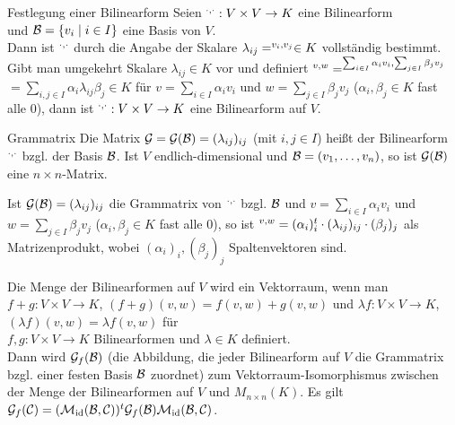 \begin{Satz}{Festlegung einer Bilinearform}
    Seien $\sp{\cdot, \cdot}: V \times V \rightarrow K$ eine Bilinearform \\
    und $\mathcal{B} = \{v_i \;|\; i \in I\}$ eine Basis von $V$. \\
    Dann ist $\sp{\cdot, \cdot}$ durch die Angabe der Skalare
    $\lambda_{ij} = \sp{v_i, v_j} \in K$ vollständig bestimmt. \\
    Gibt man umgekehrt Skalare $\lambda_{ij} \in K$ vor und definiert
    $\sp{v, w} = \sp{\sum_{i \in I} \alpha_i v_i, \sum_{j \in I} \beta_j v_j}$\\
    $= \sum_{i, j \in I} \alpha_i \lambda_{ij} \beta_j \in K$
    für $v = \sum_{i \in I} \alpha_i v_i$ und
    $w = \sum_{j \in I} \beta_j v_j$ ($\alpha_i, \beta_j \in K$ fast alle $0$),
    dann ist $\sp{\cdot, \cdot}: V \times V \rightarrow K$ eine Bilinearform
    auf $V$.
\end{Satz}

\begin{Def}{Grammatrix}
    Die Matrix $\mathcal{G} = \mathcal{G}(\mathcal{B}) = (\lambda_{ij})_{ij}$
    (mit $i, j \in I$) heißt  der Bilinearform
    $\sp{\cdot, \cdot}$ bzgl. der Basis $\mathcal{B}$.
    Ist $V$ endlich-dimensional und $\mathcal{B} = (v_1, \ldots, v_n)$,
    so ist $\mathcal{G}(\mathcal{B})$ eine $n \times n$-Matrix.
\end{Def}

\begin{Bem}
    Ist $\mathcal{G}(\mathcal{B}) = (\lambda_{ij})_{ij}$ die Grammatrix
    von $\sp{\cdot, \cdot}$ bzgl. $\mathcal{B}$ und
    $v = \sum_{i \in I} \alpha_i v_i$ und $w = \sum_{j \in I} \beta_j v_j$
    ($\alpha_i, \beta_j \in K$ fast alle $0$), so ist
    $\sp{v, w} = (\alpha_i)_i^t \cdot (\lambda_{ij})_{ij} \cdot (\beta_j)_j$
    als Matrizenprodukt, wobei $(\alpha_i)_i, (\beta_j)_j$ Spaltenvektoren
    sind.
\end{Bem}

\begin{Bem}
    Die Menge der Bilinearformen auf $V$ wird ein Vektorraum, wenn
    man $f+g: V \times V \rightarrow K$, $(f+g)(v, w) = f(v, w) + g(v, w)$
    und $\lambda f: V \times V \rightarrow K$,
    $(\lambda f)(v, w) = \lambda f(v, w)$ für \\
    $f, g: V \times V \rightarrow K$
    Bilinearformen und $\lambda \in K$ definiert. \\
    Dann wird $\mathcal{G}_f(\mathcal{B})$ (die Abbildung, die jeder Bilinearform
    auf $V$ die Grammatrix bzgl. einer festen Basis $\mathcal{B}$ zuordnet)
    zum Vektorraum-Isomorphismus zwischen der Menge der Bilinearformen
    auf $V$ und $M_{n \times n}(K)$.
    Es gilt $\mathcal{G}_f(\mathcal{C}) = (\mathcal{M}_{\operatorname{id}}(\mathcal{B},\mathcal{C}))^t
    \mathcal{G}_f(\mathcal{B}) \mathcal{M}_{\operatorname{id}}(\mathcal{B},\mathcal{C})$.
\end{Bem}

